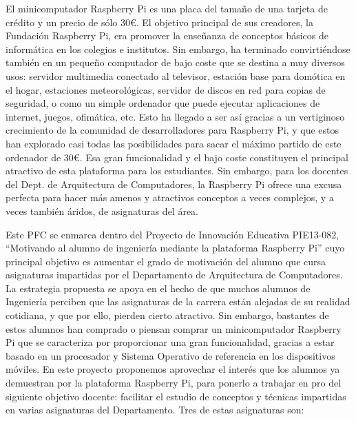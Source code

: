 \minitoc

\begin{sinopsis}
\label{sec:intro:sinop}
El minicomputador Raspberry Pi es una placa del tamaño de una tarjeta de crédito y un
precio de sólo 30€. El objetivo principal de sus creadores, la Fundación Raspberry Pi,
era promover la enseñanza de conceptos básicos de informática en los colegios e institutos.
Sin embargo, ha terminado convirtiéndose también en un pequeño computador de bajo
coste que se destina a muy diversos usos: servidor multimedia conectado al televisor,
estación base para domótica en el hogar, estaciones meteorológicas, servidor de discos
en red para copias de seguridad, o como un simple ordenador que puede ejecutar
aplicaciones de internet, juegos, ofimática, etc. Esto ha llegado a ser así gracias
a un vertiginoso crecimiento de la comunidad de desarrolladores para Raspberry Pi,
y que estos han explorado casi todas las posibilidades para sacar el máximo partido
de este ordenador de 30€. Esa gran funcionalidad y el bajo coste constituyen el
principal atractivo de esta plataforma para los estudiantes. Sin embargo, para los
docentes del Dept. de Arquitectura de Computadores, la Raspberry Pi ofrece una excusa
perfecta para hacer más amenos y atractivos conceptos a veces complejos, y a veces
también áridos, de asignaturas del área.

Este PFC se enmarca dentro del Proyecto de Innovación Educativa PIE13-082, ``Motivando
al alumno de ingeniería mediante la plataforma Raspberry Pi'' cuyo principal objetivo es
aumentar el grado de motivación del alumno que cursa asignaturas impartidas por el
Departamento de Arquitectura de Computadores. La estrategia propuesta se apoya en el
hecho de que muchos alumnos de Ingeniería perciben que las asignaturas de la carrera
están alejadas de su realidad cotidiana, y que por ello, pierden cierto atractivo. Sin
embargo, bastantes de estos alumnos han comprado o piensan comprar un minicomputador
Raspberry Pi que se caracteriza por proporcionar una gran funcionalidad, gracias a
estar basado en un procesador y Sistema Operativo de referencia en los dispositivos
móviles. En este proyecto proponemos aprovechar el interés que los alumnos ya
demuestran por la plataforma Raspberry Pi, para ponerlo a trabajar en pro del
siguiente objetivo docente: facilitar el estudio de conceptos y técnicas impartidas
 en varias asignaturas del Departamento. Tres de estas asignaturas son:


\end{sinopsis}
